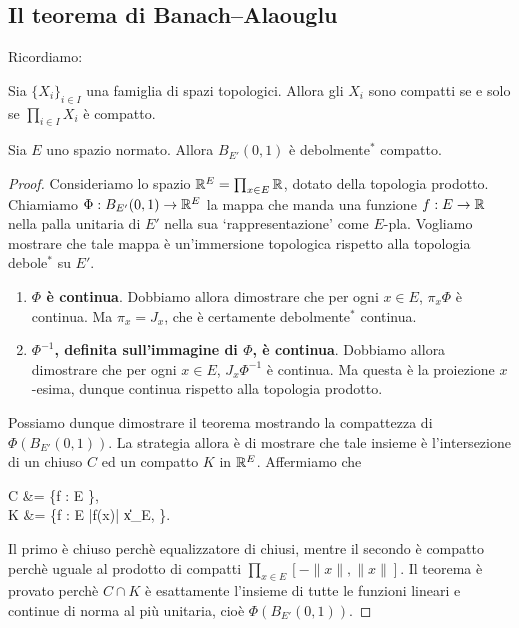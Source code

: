 \subsection{Il teorema di Banach--Alaouglu}
Ricordiamo:

\begin{theorem}[Tychonoff]
\label{th:tychonoff}
	Sia $\{X_i\}_{i \in I}$ una famiglia di spazi topologici.
	Allora gli $X_i$ sono compatti se e solo se $\prod_{i \in I} X_i$ è compatto.
\end{theorem}

\begin{theorem}
\label{th:banach_alaouglu}
	Sia $E$ uno spazio normato.
	Allora $B_{E'}(0,1)$ è debolmente$^*$ compatto.
\end{theorem}
\begin{proof}
	Consideriamo lo spazio $\mathbb{R}^E = \prod_{x \in E} \mathbb{R}$, dotato della topologia prodotto.
	Chiamiamo $\Phi : B_{E'}(0,1) \to \mathbb{R}^E$ la mappa che manda una funzione $f : E \to \mathbb{R}$ nella palla unitaria di $E'$ nella sua `rappresentazione' come $E$-pla. Vogliamo mostrare che tale mappa è un'immersione topologica rispetto alla topologia debole$^*$ su $E'$.
	\begin{enumerate}
		\item \textbf{$\Phi$ è continua}. Dobbiamo allora dimostrare che per ogni $x \in E$, $\pi_x \Phi$ è continua. Ma $\pi_x = J_x$, che è certamente debolmente$^*$ continua.
		\item \textbf{$\Phi^{-1}$, definita sull'immagine di $\Phi$, è continua}. Dobbiamo allora dimostrare che per ogni $x \in E$, $J_x \Phi^{-1}$ è continua. Ma questa è la proiezione $x$-esima, dunque continua rispetto alla topologia prodotto.
	\end{enumerate}
	Possiamo dunque dimostrare il teorema mostrando la compattezza di $\Phi(B_{E'}(0,1))$. La strategia allora è di mostrare che tale insieme è l'intersezione di un chiuso $C$ ed un compatto $K$ in $\mathbb{R}^E$. Affermiamo che
	\begin{eqalign*}
		C &= \{f : E \to \R \suchthat {}\},\\
		K &= \{f : E \to \R \suchthat |f(x)| \leq \|x\|_E, \}.
	\end{eqalign*}
	Il primo è chiuso perchè equalizzatore di chiusi, mentre il secondo è compatto perchè uguale al prodotto di compatti $\prod_{x \in E} [-\|x\|, \|x\|]$. Il teorema è provato perchè $C \cap K$ è esattamente l'insieme di tutte le funzioni lineari e continue di norma al più unitaria, cioè $\Phi(B_{E'}(0,1))$.
\end{proof}

